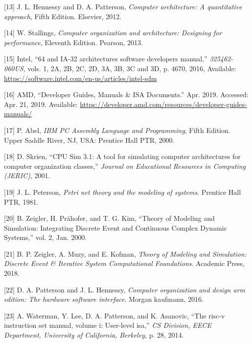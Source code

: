 \documentclass[12pt,twoside]{templates/unerthesis}
\begin{document}
\leavevmode\hypertarget{ref-hennessy_computer_2012}{}%
{[}13{]} J. L. Hennessy and D. A. Patterson, \emph{Computer architecture: A quantitative approach}, Fifth Edition. Elsevier, 2012.

\leavevmode\hypertarget{ref-stallings_computer_2013}{}%
{[}14{]} W. Stallings, \emph{Computer organization and architecture: Designing for performance}, Eleventh Edition. Pearson, 2013.

\leavevmode\hypertarget{ref-intel_64_2016}{}%
{[}15{]} Intel, ``64 and IA-32 architectures software developers manual,'' \emph{325462-060US}, vols. 1, 2A, 2B, 2C, 2D, 3A, 3B, 3C and 3D, p. 4670, 2016, Available: \url{https://software.intel.com/en-us/articles/intel-sdm}

\leavevmode\hypertarget{ref-amd_developer_2019}{}%
{[}16{]} AMD, ``Developer Guides, Manuals \& ISA Documents.'' Apr. 2019. Accessed: Apr. 21, 2019. Available: \url{https://developer.amd.com/resources/developer-guides-manuals/}

\leavevmode\hypertarget{ref-abel_ibm_2000}{}%
{[}17{]} P. Abel, \emph{IBM PC Assembly Language and Programming}, Fifth Edition. Upper Saddle River, NJ, USA: Prentice Hall PTR, 2000.

\leavevmode\hypertarget{ref-skrien_cpu_2001}{}%
{[}18{]} D. Skrien, ``CPU Sim 3.1: A tool for simulating computer architectures for computer organization classes,'' \emph{Journal on Educational Resources in Computing (JERIC)}, 2001.

\leavevmode\hypertarget{ref-peterson_petri_1981}{}%
{[}19{]} J. L. Peterson, \emph{Petri net theory and the modeling of systems}. Prentice Hall PTR, 1981.

\leavevmode\hypertarget{ref-zeigler_theory_2000}{}%
{[}20{]} B. Zeigler, H. Prähofer, and T. G. Kim, ``Theory of Modeling and Simulation: Integrating Discrete Event and Continuous Complex Dynamic Systems,'' vol. 2, Jan. 2000.

\leavevmode\hypertarget{ref-zeigler_theory_2018}{}%
{[}21{]} B. P. Zeigler, A. Muzy, and E. Kofman, \emph{Theory of Modeling and Simulation: Discrete Event \& Iterative System Computational Foundations}. Academic Press, 2018.

\leavevmode\hypertarget{ref-patterson2016computer}{}%
{[}22{]} D. A. Patterson and J. L. Hennessy, \emph{Computer organization and design arm edition: The hardware software interface}. Morgan kaufmann, 2016.

\leavevmode\hypertarget{ref-waterman2014risc}{}%
{[}23{]} A. Waterman, Y. Lee, D. A. Patterson, and K. Asanovic, ``The risc-v instruction set manual, volume i: User-level isa,'' \emph{CS Division, EECE Department, University of California, Berkeley}, p. 28, 2014.
\end{document}
